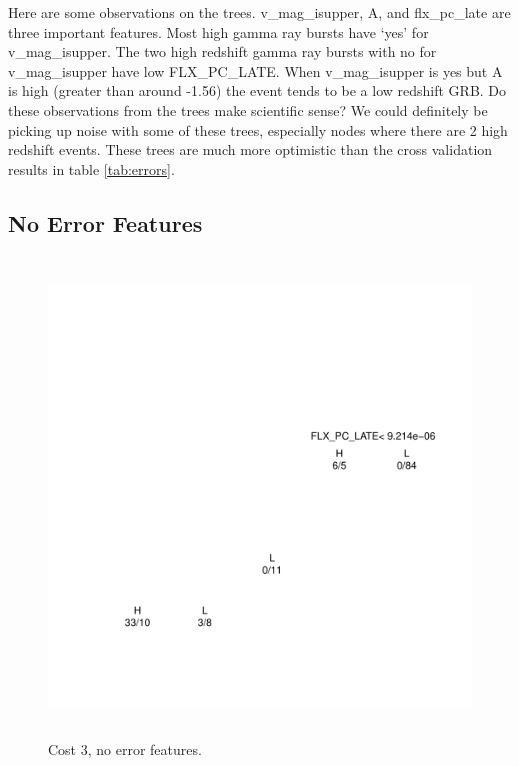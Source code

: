 \documentclass[10pt]{article}
\begin{document}
Here are some observations on the trees. v\_mag\_isupper, A, and flx\_pc\_late are three important features. Most high gamma ray bursts have `yes' for v\_mag\_isupper. The two high redshift gamma ray bursts with no for v\_mag\_isupper have low FLX\_PC\_LATE. When v\_mag\_isupper is yes but A is high (greater than around -1.56) the event tends to be a low redshift GRB. Do these observations from the trees make scientific sense? We could definitely be picking up noise with some of these trees, especially nodes where there are 2 high redshift events. These trees are much more optimistic than the cross validation results in table \ref{tab:errors}. 

\subsection{No Error Features}

\begin{figure}[H]
\begin{center}
\includegraphics[height=5in,width=5in]{noErrorCost3.pdf}
\caption{Cost 3, no error features.\label{fig:noErrorCost3}}
\end{center}
\end{figure}
\end{document}
